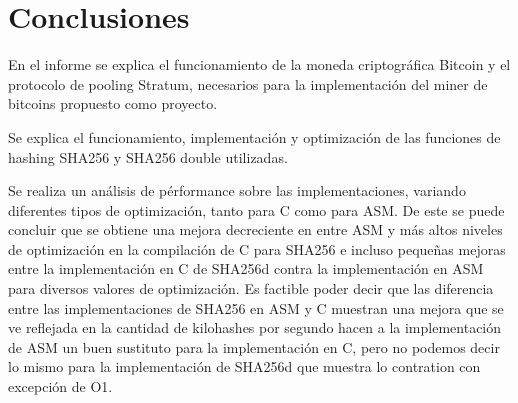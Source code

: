 \documentclass[a4paper, 10pt, twoside]{article}
\begin{document}
\section{Conclusiones}
En el informe se explica el funcionamiento de la moneda criptográfica Bitcoin y el protocolo de pooling Stratum, necesarios para la implementación del miner de bitcoins propuesto como proyecto.

Se explica el funcionamiento, implementación y optimización de las funciones de hashing SHA256 y SHA256 double utilizadas.

Se realiza un análisis de pérformance sobre las implementaciones, variando diferentes tipos de optimización, tanto para C como para ASM. De este se puede concluir que se obtiene una mejora decreciente en entre ASM y más altos niveles de optimización en la compilación de C para SHA256 e incluso pequeñas mejoras entre la implementación en C de SHA256d contra la implementación en ASM para diversos valores de optimización. Es factible poder decir que las diferencia entre las implementaciones de SHA256 en ASM y C muestran una mejora que se ve reflejada en la cantidad de kilohashes por segundo hacen a la implementación de ASM un buen sustituto para la implementación en C, pero no podemos decir lo mismo para la implementación de SHA256d que muestra lo contration con excepción de O1.
\end{document}
